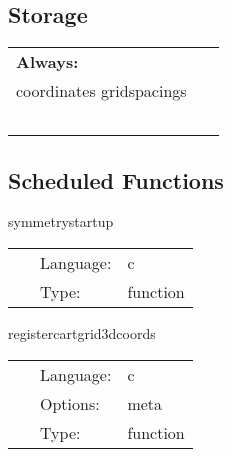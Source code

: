 \documentclass{article}
\begin{document}
\subsection*{Storage}

\hspace{5mm}

 \begin{tabular*}{160mm}{ll} 

{\bf Always:}&  ~ \\ 
 coordinates gridspacings & ~\\ 
~ & ~\\ 
\end{tabular*} 


\subsection*{Scheduled Functions}
\vspace{5mm}


\hspace{5mm} symmetrystartup 

\hspace{5mm}{\it register gh extension for gridsymmetry } 


\hspace{5mm}

 \begin{tabular*}{160mm}{cll} 
~ & Language:  & c \\ 
~ & Type:  & function \\ 
\end{tabular*} 


\vspace{5mm}


\hspace{5mm} registercartgrid3dcoords 

\hspace{5mm}{\it register coordinates for the cartesian grid } 


\hspace{5mm}

 \begin{tabular*}{160mm}{cll} 
~ & Language:  & c \\ 
~ & Options:  & meta \\ 
~ & Type:  & function \\ 
\end{tabular*} 
\end{document}
